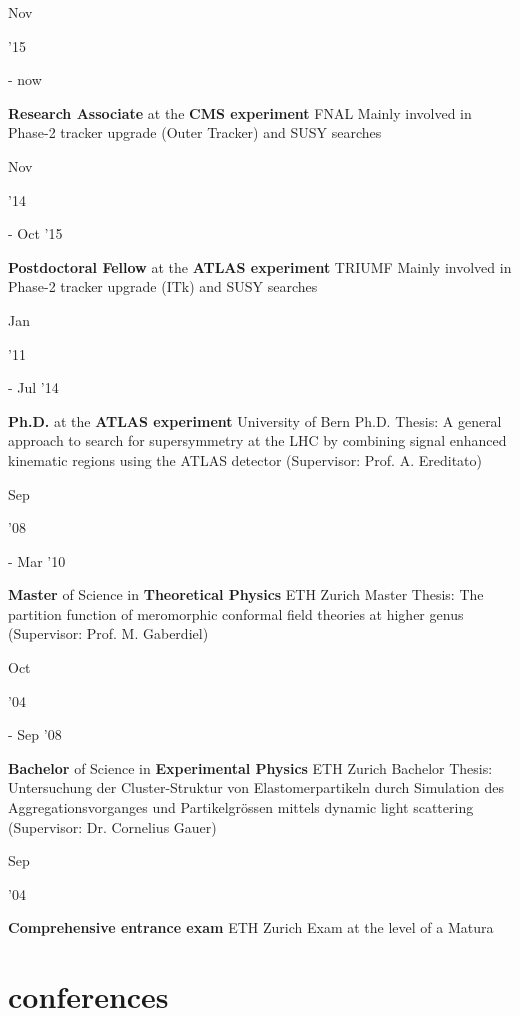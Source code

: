 \documentclass[]{cv} %
\begin{document}
\begin{entrylist}
  \entry
  {\parbox[t]{\parboxWidthOne}{Nov}\parbox[t]{\parboxWidthTwo}{\hfill '15} - now}
  {\textbf{Research Associate} at the \textbf{CMS experiment}}
  {FNAL}
  {Mainly involved in Phase-2 tracker upgrade (Outer Tracker) and SUSY searches}
  \entry
  {\parbox[t]{\parboxWidthOne}{Nov}\parbox[t]{\parboxWidthTwo}{\hfill '14} - Oct '15}
  {\textbf{Postdoctoral Fellow} at the \textbf{ATLAS experiment}}
  {TRIUMF}
  {Mainly involved in Phase-2 tracker upgrade (ITk) and SUSY searches}
  \entry
  {\parbox[t]{\parboxWidthOne}{Jan}\parbox[t]{\parboxWidthTwo}{\hfill '11} - Jul '14}
  {\textbf{Ph.D.} at the \textbf{ATLAS experiment}}
  {University of Bern}
  {Ph.D. Thesis: A general approach to search for supersymmetry at the LHC by combining signal enhanced kinematic regions using the ATLAS detector (Supervisor:
  Prof. A. Ereditato)}
  \entry
  {\parbox[t]{\parboxWidthOne}{Sep}\parbox[t]{\parboxWidthTwo}{\hfill '08} - Mar '10}
  {\textbf{Master} of Science in \textbf{Theoretical Physics}}
  {ETH Zurich}
  {Master Thesis: The partition function of meromorphic conformal field theories at higher genus (Supervisor: Prof. M. Gaberdiel)}
  \entry
  {\parbox[t]{\parboxWidthOne}{Oct}\parbox[t]{\parboxWidthTwo}{\hfill '04} - Sep '08}
  {\textbf{Bachelor} of Science in \textbf{Experimental Physics}}
  {ETH Zurich}
  {Bachelor Thesis: Untersuchung der Cluster-Struktur von Elastomerpartikeln durch Simulation des Aggregationsvorganges und Partikelgr{\"o}ssen mittels dynamic
light scattering (Supervisor: Dr. Cornelius Gauer)}
\entry
{\parbox[t]{\parboxWidthOne}{Sep}\parbox[t]{\parboxWidthTwo}{\hfill '04}}
{\textbf{Comprehensive entrance exam}}
{ETH Zurich}
{Exam at the level of a Matura}
\end{entrylist}

\section{conferences}
\end{document}
